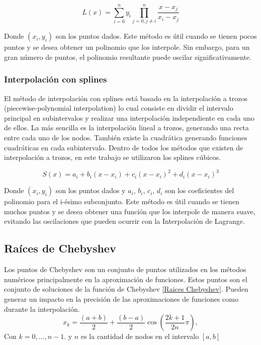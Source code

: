 \documentclass[12pt,a4]{article} %
\begin{document}
\begin{multicols}{2}
\begin{equation}
    L(x) = \sum_{i=0}^{n} y_i \prod_{j=0, j\neq i}^{n} \frac{x - x_j}{x_i - x_j}
    \label{lagrange}
\end{equation}

Donde $(x_i, y_i)$ son los puntos dados. Este método es útil cuando se tienen pocos puntos y se desea obtener un polinomio que los interpole. Sin embargo, para un gran número de puntos, el polinomio resultante puede oscilar significativamente.
\subsubsection{Interpolación con splines}
El método de interpolación con splines está basado en la interpolación a trozos (piecewise-polynomial interpolation) lo cual consiste en dividir el intervalo principal en subintervalos y realizar una interpolación independiente en cada uno de ellos. La más sencilla es la interpolación lineal a trozos, generando una recta entre cada uno de los nodos. También existe la cuadrática generando funciones cuadráticas en cada subintervalo. Dentro de todos los métodos que existen de interpolación a trozos, en este trabajo se utilizaron los splines cúbicos.

\begin{equation}
    S(x) = a_i + b_i(x - x_i) + c_i(x - x_i)^2 + d_i(x - x_i)^3
    \label{spline cubico}
\end{equation}

Donde $(x_i, y_i)$ son los puntos dados y $a_i$, $b_i$, $c_i$, $d_i$ son los coeficientes del polinomio para el i-ésimo subconjunto. Este método es útil cuando se tienen muchos puntos y se desea obtener una función que los interpole de manera suave, evitando las oscilaciones que pueden ocurrir con la Interpolación de Lagrange.


\subsection{Raíces de Chebyshev}
Los puntos de Chebyshev son un conjunto de puntos utilizados en los métodos numéricos principalmente en la aproximación de funciones. Estos puntos son el conjunto de soluciones de la función de Chebyshev \eqref{Raices Chebyshev}. Pueden generar un impacto en la precisión de las aproximaciones de funciones como durante la interpolación. 
\begin{equation}
    x_{k} = \frac{(a+b)}{2} + \frac{(b-a)}{2} \cos \left( \frac{2k+1}{2n} \pi \right),   
    \label{Raices Chebyshev}
\end{equation}
Con $ k = 0, \ldots, n-1.$ y $n$ es la cantidad de nodos en el intervalo $[a,b]$


\end{multicols}
\end{document}
